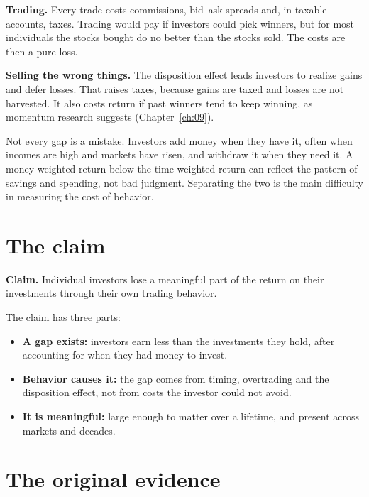 \textbf{Trading.} Every trade costs commissions, bid--ask spreads and, in taxable accounts, taxes. Trading would pay if investors could pick winners, but for most individuals the stocks bought do no better than the stocks sold. The costs are then a pure loss.

\textbf{Selling the wrong things.} The disposition effect leads investors to realize gains and defer losses. That raises taxes, because gains are taxed and losses are not harvested. It also costs return if past winners tend to keep winning, as momentum research suggests (Chapter~\ref{ch:09}).

Not every gap is a mistake. Investors add money when they have it, often when incomes are high and markets have risen, and withdraw it when they need it. A money-weighted return below the time-weighted return can reflect the pattern of savings and spending, not bad judgment. Separating the two is the main difficulty in measuring the cost of behavior.

\section{The claim}
\label{sec:24-claim}

\begin{callout}
\textbf{Claim.} Individual investors lose a meaningful part of the return on their investments through their own trading behavior.
\end{callout}

The claim has three parts:

\begin{itemize}
  \item \textbf{A gap exists:} investors earn less than the investments they hold, after accounting for when they had money to invest.
  \item \textbf{Behavior causes it:} the gap comes from timing, overtrading and the disposition effect, not from costs the investor could not avoid.
  \item \textbf{It is meaningful:} large enough to matter over a lifetime, and present across markets and decades.
\end{itemize}

\section{The original evidence}
\label{sec:24-evidence}

